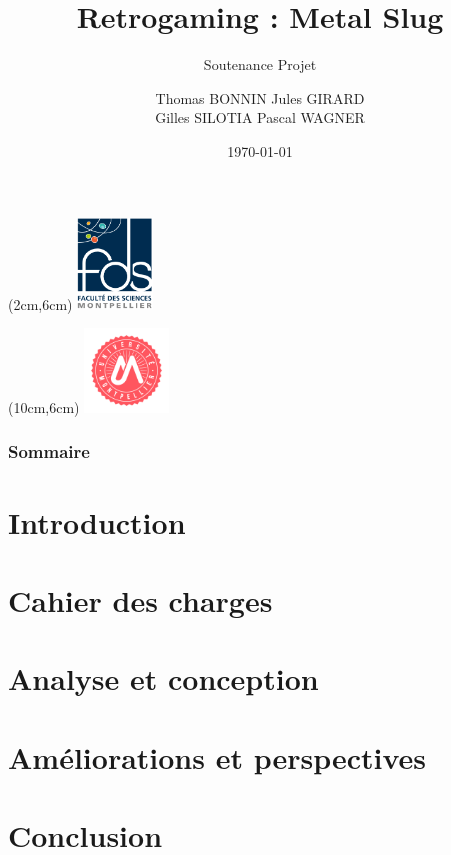 \documentclass{beamer}
\title[Présentation]{Retrogaming : Metal Slug}
\subtitle[\ldots]{Soutenance Projet}
\author[BONNIN GIRARD SILOTIA WAGNER]{Thomas BONNIN Jules GIRARD \\ Gilles SILOTIA Pascal WAGNER}
\institute[UM2]{Université de Montpellier}
\institute[UM2]{Université de Montpellier \\ Faculté des Sciences}
\date{\today}
\begin{document}
		
		\begingroup
			\makeatletter
				\setlength{\hoffset}{-.5\beamer@sidebarwidth}
			\makeatother
			\begin{frame}[plain]
				\begin{textblock*}{2cm}(2cm,6cm) %
					\includegraphics[width=2cm]{figures/logo_fds.png}
				\end{textblock*}
				\begin{textblock*}{2.25cm}(10cm,6cm) %
					\includegraphics[width=2.25cm]{figures/logo_um.png}
				\end{textblock*}
				\titlepage
			\end{frame}
		\endgroup
		
		\begin{frame}
			\frametitle{Sommaire}
			\tableofcontents[hideallsubsections]
		\end{frame}
		
		\section{Introduction}
		
		
		\section{Cahier des charges}
		
		
		\section{Analyse et conception}
		
		 
		\section{Améliorations et perspectives}
		
		
		\section{Conclusion}
		
		
	
\end{document}
